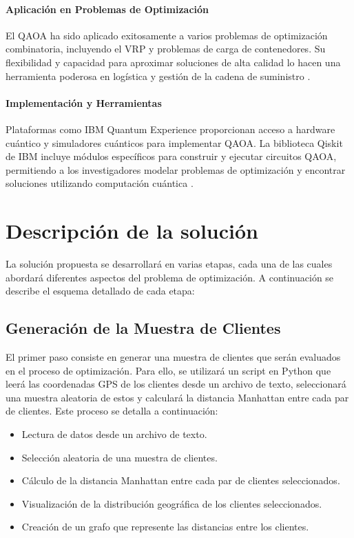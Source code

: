 \documentclass[11pt,a4paper,spanish]{book}
\begin{document}
\begin{itemize}
\subsubsection{Aplicación en Problemas de Optimización}

El QAOA ha sido aplicado exitosamente a varios problemas de optimización combinatoria, incluyendo el VRP y problemas de carga de contenedores. Su flexibilidad y capacidad para aproximar soluciones de alta calidad lo hacen una herramienta poderosa en logística y gestión de la cadena de suministro \cite{phillipson2024}.

\subsubsection{Implementación y Herramientas}

Plataformas como IBM Quantum Experience proporcionan acceso a hardware cuántico y simuladores cuánticos para implementar QAOA. La biblioteca Qiskit de IBM incluye módulos específicos para construir y ejecutar circuitos QAOA, permitiendo a los investigadores modelar problemas de optimización y encontrar soluciones utilizando computación cuántica \cite{gibneyQuantumTech}.

\chapter{Descripción de la solución}

La solución propuesta se desarrollará en varias etapas, cada una de las cuales abordará diferentes aspectos del problema de optimización. A continuación se describe el esquema detallado de cada etapa:

\section{Generación de la Muestra de Clientes}

El primer paso consiste en generar una muestra de clientes que serán evaluados en el proceso de optimización. Para ello, se utilizará un script en Python que leerá las coordenadas GPS de los clientes desde un archivo de texto, seleccionará una muestra aleatoria de estos y calculará la distancia Manhattan entre cada par de clientes. Este proceso se detalla a continuación:

\begin{itemize}
	\item Lectura de datos desde un archivo de texto.
	\item Selección aleatoria de una muestra de clientes.
	\item Cálculo de la distancia Manhattan entre cada par de clientes seleccionados.
	\item Visualización de la distribución geográfica de los clientes seleccionados.
	\item Creación de un grafo que represente las distancias entre los clientes.
\end{itemize}


\end{itemize}
\end{document}
